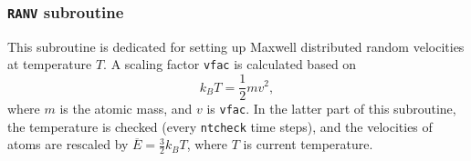 
\subsubsection{\texttt{RANV} subroutine}
\label{sssec:ranv}

This subroutine is dedicated for setting up Maxwell distributed random velocities
at temperature $T$. A scaling factor \texttt{vfac} is calculated based on
\begin{equation}
    k_B T = \frac{ 1 }{ 2 } m v^2,
\end{equation}
where $m$ is the atomic mass, and $v$ is \texttt{vfac}.
In the latter part of this subroutine, the temperature is checked (every \texttt{ntcheck} time steps),
and the velocities of atoms are rescaled by $\overline{E} = \frac{ 3 }{ 2 } k_B T$, where $T$ is current
temperature.
